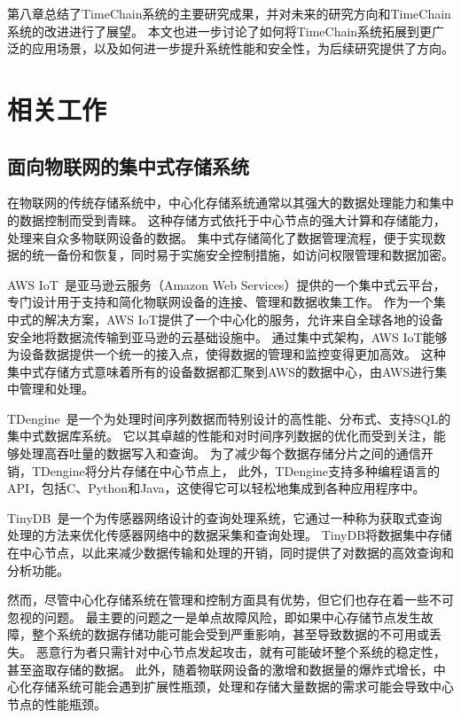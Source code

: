 第八章总结了TimeChain系统的主要研究成果，并对未来的研究方向和TimeChain系统的改进进行了展望。
本文也进一步讨论了如何将TimeChain系统拓展到更广泛的应用场景，以及如何进一步提升系统性能和安全性，为后续研究提供了方向。

\chapter{相关工作}
\section{面向物联网的集中式存储系统}
在物联网的传统存储系统中，中心化存储系统通常以其强大的数据处理能力和集中的数据控制而受到青睐。
这种存储方式依托于中心节点的强大计算和存储能力，处理来自众多物联网设备的数据。
集中式存储简化了数据管理流程，便于实现数据的统一备份和恢复，同时易于实施安全控制措施，如访问权限管理和数据加密。

AWS IoT~\cite{aws}是亚马逊云服务（Amazon Web Services）提供的一个集中式云平台，专门设计用于支持和简化物联网设备的连接、管理和数据收集工作。
作为一个集中式的解决方案，AWS IoT提供了一个中心化的服务，允许来自全球各地的设备安全地将数据流传输到亚马逊的云基础设施中。
通过集中式架构，AWS IoT能够为设备数据提供一个统一的接入点，使得数据的管理和监控变得更加高效。
这种集中式存储方式意味着所有的设备数据都汇聚到AWS的数据中心，由AWS进行集中管理和处理。

TDengine~\cite{tdengine}是一个为处理时间序列数据而特别设计的高性能、分布式、支持SQL的集中式数据库系统。
它以其卓越的性能和对时间序列数据的优化而受到关注，能够处理高吞吐量的数据写入和查询。
为了减少每个数据存储分片之间的通信开销，TDengine将分片存储在中心节点上，
此外，TDengine支持多种编程语言的API，包括C、Python和Java，这使得它可以轻松地集成到各种应用程序中。

TinyDB~\cite{madden2005tinydb}是一个为传感器网络设计的查询处理系统，它通过一种称为获取式查询处理的方法来优化传感器网络中的数据采集和查询处理。
TinyDB将数据集中存储在中心节点，以此来减少数据传输和处理的开销，同时提供了对数据的高效查询和分析功能。

然而，尽管中心化存储系统在管理和控制方面具有优势，但它们也存在着一些不可忽视的问题。
最主要的问题之一是单点故障风险，即如果中心存储节点发生故障，整个系统的数据存储功能可能会受到严重影响，甚至导致数据的不可用或丢失。
恶意行为者只需针对中心节点发起攻击，就有可能破坏整个系统的稳定性，甚至盗取存储的数据。
此外，随着物联网设备的激增和数据量的爆炸式增长，中心化存储系统可能会遇到扩展性瓶颈，处理和存储大量数据的需求可能会导致中心节点的性能瓶颈。

